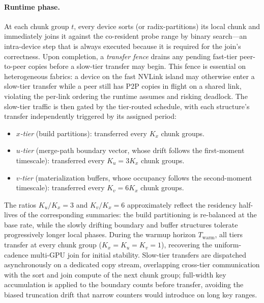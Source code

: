 \documentclass{article}
\begin{document}
\paragraph{Runtime phase.}
At each chunk group $t$, every device sorts (or radix-partitions) its local
chunk and immediately joins it against the co-resident probe range by binary
search---an intra-device step that is always executed because it is required for
the join's correctness. Upon completion, a \emph{transfer fence} drains any
pending fast-tier peer-to-peer copies before a slow-tier transfer may begin. This
fence is essential on heterogeneous fabrics: a device on the fast NVLink island
may otherwise enter a slow-tier transfer while a peer still has P2P copies in
flight on a shared link, violating the per-link ordering the runtime assumes and
risking deadlock. The slow-tier traffic is then gated by the tier-routed
schedule, with each structure's transfer independently triggered by its assigned
period:
\begin{itemize}[nosep,leftmargin=*]
\item \emph{$x$-tier} (build partitions): transferred every $K_x$ chunk groups.
\item \emph{$u$-tier} (merge-path boundary vector, whose drift follows the
  first-moment timescale): transferred every $K_u = 3K_x$ chunk groups.
\item \emph{$v$-tier} (materialization buffers, whose occupancy follows the
  second-moment timescale): transferred every $K_v = 6K_x$ chunk groups.
\end{itemize}
The ratios $K_u/K_x = 3$ and $K_v/K_x = 6$ approximately reflect the residency
half-lives of the corresponding summaries: the build partitioning is re-balanced
at the base rate, while the slowly drifting boundary and buffer structures
tolerate progressively longer local phases. During the warmup horizon
$T_{\mathrm{warm}}$, all tiers transfer at every chunk group ($K_x = K_u = K_v =
1$), recovering the uniform-cadence multi-GPU join for initial stability. Slow-tier
transfers are dispatched asynchronously on a dedicated copy stream, overlapping
cross-tier communication with the sort and join compute of the next chunk
group; full-width key accumulation is applied to the boundary counts before
transfer, avoiding the biased truncation drift that narrow counters would
introduce on long key ranges.
\end{document}
